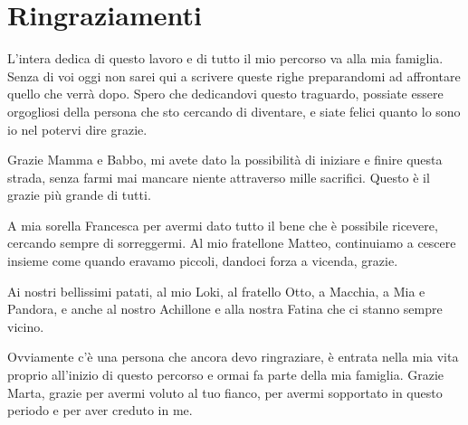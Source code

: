 \chapter*{Ringraziamenti}
L'intera dedica di questo lavoro e di tutto il mio percorso va alla mia famiglia. Senza di voi oggi non sarei qui a scrivere queste righe preparandomi ad affrontare quello che verrà dopo. Spero che dedicandovi questo traguardo, possiate essere orgogliosi della persona che sto cercando di diventare, e siate felici quanto lo sono io nel potervi dire grazie.

Grazie Mamma e Babbo, mi avete dato la possibilità di iniziare e finire questa strada, senza farmi mai mancare niente attraverso mille sacrifici. Questo è il grazie più grande di tutti.

A mia sorella Francesca per avermi dato tutto il bene che è possibile ricevere, cercando sempre di sorreggermi. Al mio fratellone Matteo, continuiamo a cescere insieme come quando eravamo piccoli, dandoci forza a vicenda, grazie. 

Ai nostri bellissimi patati, al mio Loki, al fratello Otto, a Macchia, a Mia e Pandora, e anche al nostro Achillone e alla nostra Fatina che ci stanno sempre vicino.

Ovviamente c'è una persona che ancora devo ringraziare, è entrata nella mia vita proprio all'inizio di questo percorso e ormai fa parte della mia famiglia. Grazie Marta, grazie per avermi voluto al tuo fianco, per avermi sopportato in questo periodo e per aver creduto in me.
